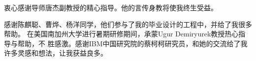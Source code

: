 
\begin{ack}
  衷心感谢导师唐杰副教授的精心指导。他的言传身教将使我终生受益。

  感谢陈麒聪、曹烨、杨洋同学，他们参与了我的毕业设计的工程中，并给了我很多帮助。
  在美国南加州大学进行暑期研修期间，承蒙Ugur Demiryurek教授热心指导与帮助，不
  胜感激。感谢IBM中国研究院的蔡柯柯研究员，和她的交流给了我许多灵感和想法，让我获益良多。
  
\end{ack}
